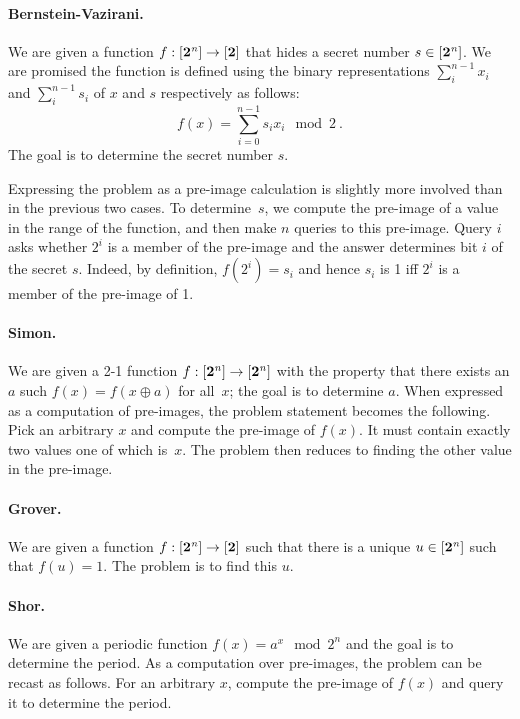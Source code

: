 \documentclass[sigplan,screen]{acmart}
\newcommand{\finset}[1]{[\mathbf{#1}]}
\theoremstyle{definition}
\begin{document}
\paragraph*{Bernstein-Vazirani.}
We are given a function $f : \finset{2^{\it n}} \rightarrow \finset{2}$
that hides a secret number $s \in \finset{2^{\it n}}$. We are promised the
function is defined using the binary representations $\sum_i^{n-1}
x_i$ and $\sum_i^{n-1} s_i$ of $x$ and $s$ respectively as follows:
\[
f(x) = \sum_{i=0}^{n-1} s_ix_i \mod{2} \ .
\]
The goal is to determine the secret number $s$.

Expressing the problem as a pre-image calculation is slightly more
involved than in the previous two cases. To determine~$s$, we compute
the pre-image of a value in the range of the function, and then make
$n$ queries to this pre-image. Query $i$ asks whether $2^i$ is a
member of the pre-image and the answer determines bit $i$ of the
secret $s$. Indeed, by definition, $f(2^i) = s_i$ and hence $s_i$ is 1
iff $2^i$ is a member of the pre-image of 1.

\paragraph*{Simon.}
We are given a 2-1 function $f : \finset{2^{\it n}} \rightarrow
\finset{2^{\it n}}$ with the property that there exists an $a$ such $f(x) =
f(x \oplus a)$ for all~$x$; the goal is to determine $a$. When
expressed as a computation of pre-images, the problem statement
becomes the following. Pick an arbitrary $x$ and compute the pre-image
of $f(x)$. It must contain exactly two values one of which is~$x$. The
problem then reduces to finding the other value in the pre-image.

\paragraph*{Grover.}
We are given a function $f : \finset{2^{\it n}} \rightarrow \finset{2}$
such that there is a unique $u \in \finset{2^{\it n}}$ such that $f(u)=1$.
The problem is to find this $u$.

\paragraph*{Shor.}
We are given a periodic function $f(x) = a^x \mod{2^n}$ and the goal
is to determine the period. As a computation over pre-images, the
problem can be recast as follows. For an arbitrary $x$, compute the
pre-image of $f(x)$ and query it to determine the period.
\end{document}
